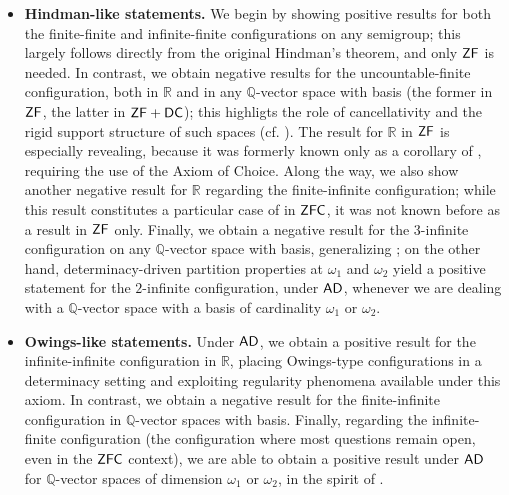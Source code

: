 \documentclass[10pt,a4paper]{amsart}
\theoremstyle{definition}
\newcommand{\zf}{\mathnormal{\mathsf{ZF}}}
\newcommand{\dc}{\mathnormal{\mathsf{DC}}}
\newcommand{\ad}{\mathnormal{\mathsf{AD}}}
\newcommand{\zfc}{\mathnormal{\mathsf{ZFC}}}
\theoremstyle{remark}
\numberwithin{equation}{section}
\begin{document}
\begin{itemize}
  \item \textbf{Hindman-like statements.}
  We begin by showing positive results for both the finite-finite and infinite-finite configurations on any semigroup; this largely follows directly from the original Hindman's theorem, and only $\zf$ is needed. In contrast, we obtain negative results for the uncountable-finite configuration, both in $\mathbb R$ and in any $\mathbb Q$-vector space with basis (the former in $\zf$, the latter in $\zf+\dc$); this highligts the role of cancellativity and the rigid support structure of such spaces (cf. \cite{Fernandez2018}). The result for $\mathbb R$ in $\zf$ is especially revealing, because it was formerly known only as a corollary of \cite[Theorem 5]{Fernandez2018}, requiring the use of the Axiom of Choice. Along the way, we also show another negative result for $\mathbb R$ regarding the finite-infinite configuration; while this result constitutes a particular case of \cite[Theorem 12]{FernandezLee2020} in $\zfc$, it was not known before as a result in $\zf$ only. Finally, we obtain a negative result for the $3$-infinite configuration on any $\mathbb Q$-vector space with basis, generalizing \cite[Theorem 5]{FernandezLee2020}; on the other hand, determinacy-driven partition properties at $\omega_1$ and $\omega_2$ yield a positive statement for the $2$-infinite configuration, under $\ad$, whenever we are dealing with a $\mathbb Q$-vector space with a basis of cardinality $\omega_1$ or $\omega_2$.

  \item \textbf{Owings-like statements.}
  Under $\ad$, we obtain a positive result for the infinite-infinite configuration in $\mathbb R$, placing Owings-type configurations in a determinacy setting and exploiting regularity phenomena available under this axiom. In contrast, we obtain a negative result for the finite-infinite configuration in $\mathbb Q$-vector spaces with basis. Finally, regarding the infinite-finite configuration (the configuration where most questions remain open, even in the $\zfc$ context), we are able to obtain a positive result under $\ad$ for $\mathbb{Q}$-vector spaces of dimension $\omega_1$ or $\omega_2$, in the spirit of \cite{LeaderRussell2020}.
\end{itemize}
\end{document}
